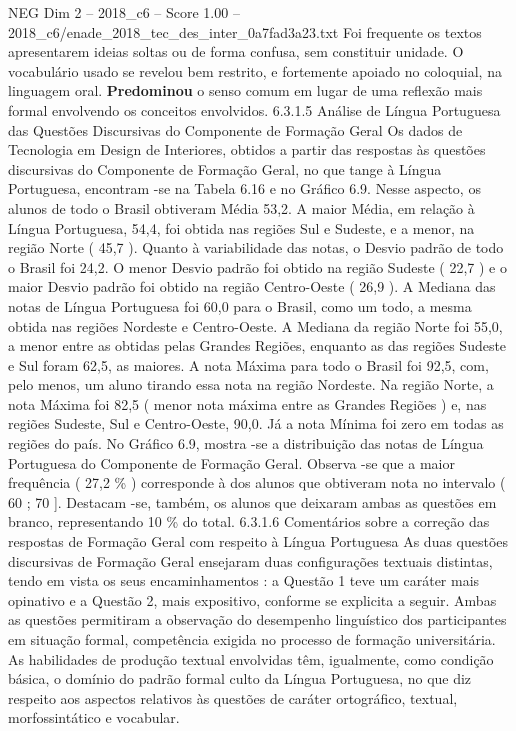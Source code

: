 \begin{textsample}{NEG Dim 2 – 2018\_c6 – Score 1.00 – 2018\_c6/enade\_2018\_tec\_des\_inter\_0a7fad3a23.txt}
Foi frequente os textos apresentarem ideias soltas ou de forma confusa, sem constituir unidade.
O vocabulário usado se revelou bem restrito, e fortemente apoiado no coloquial, na linguagem oral. \textbf{Predominou} o senso comum em lugar de uma reflexão mais formal envolvendo os conceitos envolvidos. 6.3.1.5 Análise de Língua Portuguesa das Questões Discursivas do Componente de Formação Geral Os dados de Tecnologia em Design de Interiores, obtidos a partir das respostas às questões discursivas do Componente de Formação Geral, no que tange à Língua Portuguesa, encontram -se na Tabela 6.16 e no Gráfico 6.9.
Nesse aspecto, os alunos de todo o Brasil obtiveram Média 53,2.
A maior Média, em relação à Língua Portuguesa, 54,4, foi obtida nas regiões Sul e Sudeste, e a menor, na região Norte ( 45,7 ).
Quanto à variabilidade das notas, o Desvio padrão de todo o Brasil foi 24,2.
O menor Desvio padrão foi obtido na região Sudeste ( 22,7 ) e o maior Desvio padrão foi obtido na região Centro-Oeste ( 26,9 ).
A Mediana das notas de Língua Portuguesa foi 60,0 para o Brasil, como um todo, a mesma obtida nas regiões Nordeste e Centro-Oeste.
A Mediana da região Norte foi 55,0, a menor entre as obtidas pelas Grandes Regiões, enquanto as das regiões Sudeste e Sul foram 62,5, as maiores.
A nota Máxima para todo o Brasil foi 92,5, com, pelo menos, um aluno tirando essa nota na região Nordeste.
Na região Norte, a nota Máxima foi 82,5 ( menor nota máxima entre as Grandes Regiões ) e, nas regiões Sudeste, Sul e Centro-Oeste, 90,0.
Já a nota Mínima foi zero em todas as regiões do país.
No Gráfico 6.9, mostra -se a distribuição das notas de Língua Portuguesa do Componente de Formação Geral.
Observa -se que a maior frequência ( 27,2 \% ) corresponde à dos alunos que obtiveram nota no intervalo ( 60 ; 70 ].
Destacam -se, também, os alunos que deixaram ambas as questões em branco, representando 10 \% do total. 6.3.1.6 Comentários sobre a correção das respostas de Formação Geral com respeito à Língua Portuguesa As duas questões discursivas de Formação Geral ensejaram duas configurações textuais distintas, tendo em vista os seus encaminhamentos : a Questão 1 teve um caráter mais opinativo e a Questão 2, mais expositivo, conforme se explicita a seguir.
Ambas as questões permitiram a observação do desempenho linguístico dos participantes em situação formal, competência exigida no processo de formação universitária.
As habilidades de produção textual envolvidas têm, igualmente, como condição básica, o domínio do padrão formal culto da Língua Portuguesa, no que diz respeito aos aspectos relativos às questões de caráter ortográfico, textual, morfossintático e vocabular.

\end{textsample}
